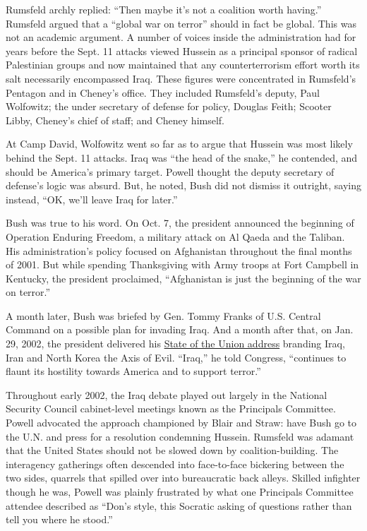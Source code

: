 Rumsfeld archly replied: ``Then maybe it's not a coalition worth
having.'' Rumsfeld argued that a ``global war on terror'' should in fact
be global. This was not an academic argument. A number of voices inside
the administration had for years before the Sept. 11 attacks viewed
Hussein as a principal sponsor of radical Palestinian groups and now
maintained that any counterterrorism effort worth its salt necessarily
encompassed Iraq. These figures were concentrated in Rumsfeld's Pentagon
and in Cheney's office. They included Rumsfeld's deputy, Paul Wolfowitz;
the under secretary of defense for policy, Douglas Feith; Scooter Libby,
Cheney's chief of staff; and Cheney himself.

At Camp David, Wolfowitz went so far as to argue that Hussein was most
likely behind the Sept. 11 attacks. Iraq was ``the head of the snake,''
he contended, and should be America's primary target. Powell thought the
deputy secretary of defense's logic was absurd. But, he noted, Bush did
not dismiss it outright, saying instead, ``OK, we'll leave Iraq for
later.''

Bush was true to his word. On Oct. 7, the president announced the
beginning of Operation Enduring Freedom, a military attack on Al Qaeda
and the Taliban. His administration's policy focused on Afghanistan
throughout the final months of 2001. But while spending Thanksgiving
with Army troops at Fort Campbell in Kentucky, the president proclaimed,
``Afghanistan is just the beginning of the war on terror.''

A month later, Bush was briefed by Gen. Tommy Franks of U.S. Central
Command on a possible plan for invading Iraq. And a month after that, on
Jan. 29, 2002, the president delivered his
\href{https://www.nytimes.com/2002/01/30/us/state-union-president-bush-s-state-union-address-congress-nation.html}{State
of the Union address} branding Iraq, Iran and North Korea the Axis of
Evil. ``Iraq,'' he told Congress, ``continues to flaunt its hostility
towards America and to support terror.''

Throughout early 2002, the Iraq debate played out largely in the
National Security Council cabinet-level meetings known as the Principals
Committee. Powell advocated the approach championed by Blair and Straw:
have Bush go to the U.N. and press for a resolution condemning Hussein.
Rumsfeld was adamant that the United States should not be slowed down by
coalition-building. The interagency gatherings often descended into
face-to-face bickering between the two sides, quarrels that spilled over
into bureaucratic back alleys. Skilled infighter though he was, Powell
was plainly frustrated by what one Principals Committee attendee
described as ``Don's style, this Socratic asking of questions rather
than tell you where he stood.''

